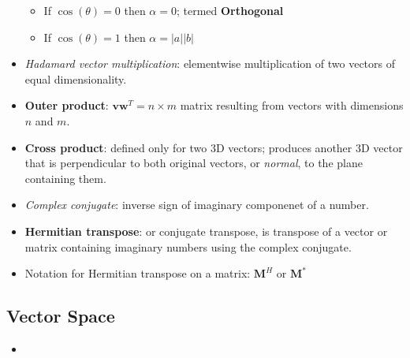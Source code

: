 \documentclass[12pt,a4paper]{article}
\begin{document}
\begin{itemize}
\begin{itemize}
            \item If \(\cos(\theta) = 0\) then \(\alpha = 0\); termed \textbf{Orthogonal}
            \item If \(\cos(\theta) = 1\) then \(\alpha = |a||b|\)
        \end{itemize}
    \item \textit{Hadamard vector multiplication}: elementwise multiplication of two vectors of equal dimensionality.
    \item \textbf{Outer product}: \(\bm{vw}^T = n \times m\) matrix resulting from vectors with dimensions \(n\) and \(m\).
    \item \textbf{Cross product}: defined only for two 3D vectors; produces another 3D vector that is perpendicular to both original vectors, or \textit{normal}, to the plane containing them.
    \item \textit{Complex conjugate}: inverse sign of imaginary componenet of a number.
    \item \textbf{Hermitian transpose}: or conjugate transpose, is transpose of a vector or matrix containing imaginary numbers using the complex conjugate. 
    \item Notation for Hermitian transpose on a matrix: \(\bm{M}^H\) or \(\bm{M}^*\)
\end{itemize}

\subsection{Vector Space}
\begin{itemize}
    \item 
\end{itemize}
\end{document}
